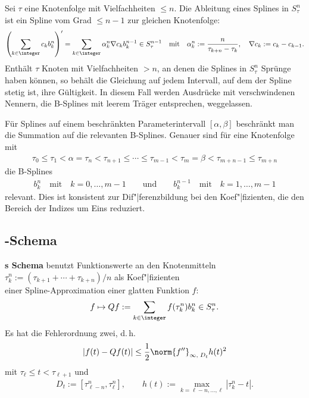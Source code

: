 Sei $\tau$ eine Knotenfolge mit Vielfachheiten $\le n$.
Die Ableitung eines Splines in $S_\tau^n$ ist ein Spline vom Grad $\le n - 1$
zur gleichen Knotenfolge:
\begin{align*}
    \left(\sum_{k \in \integer} c_k b_k^n\right)' =
    \sum_{k \in \integer} \alpha_k^n \nabla c_k b_k^{n-1} \in S_\tau^{n-1}
    \quad\text{mit}\quad
    \alpha_k^n := \frac{n}{\tau_{k+n} - \tau_k}, \quad
    \nabla c_k := c_k - c_{k-1}.
\end{align*}
Enthält $\tau$ Knoten mit Vielfachheiten $> n$, an denen die Splines in
$S_\tau^n$ Sprünge haben können, so behält die Gleichung auf jedem Intervall,
auf dem der Spline stetig ist, ihre Gültigkeit.
In diesem Fall werden Ausdrücke mit verschwindenen Nennern, die B-Splines mit
leerem Träger entsprechen, weggelassen.

\linie

Für Splines auf einem beschränkten Parameterintervall $[\alpha, \beta]$
beschränkt man die Summation auf die relevanten B-Splines.
Genauer sind für eine Knotenfolge mit
\begin{align*}
    \tau_0 \le \tau_1 < \alpha = \tau_n < \tau_{n+1} \le \dotsb \le
    \tau_{m-1} < \tau_m = \beta < \tau_{m+n-1} \le \tau_{m+n}
\end{align*}
die B-Splines
\begin{align*}
    b_k^n \quad\text{mit}\quad
    k = 0, \dotsc, m - 1 \qquad\text{und}\qquad
    b_k^{n-1} \quad\text{mit}\quad k = 1, \dotsc, m - 1
\end{align*}
relevant.
Dies ist konsistent zur Dif"|ferenzbildung bei den Koef"|fizienten, die den
Bereich der Indizes um Eins reduziert.

\subsection{%
    -Schema%
}

\textbf{s Schema} benutzt Funktionswerte an den
Knotenmitteln \\
$\tau_k^n := (\tau_{k+1} + \dotsb + \tau_{k+n})/n$ als Koef"|fizienten \\
einer Spline-Approximation einer glatten Funktion $f$:
\begin{align*}
    f \mapsto Qf := \sum_{k \in \integer} f(\tau_k^n) b_k^n \in S_\tau^n.
\end{align*}
Es hat die Fehlerordnung zwei, d.\,h.
\begin{align*}
    |f(t) - Qf(t)| \le \frac{1}{2} \norm{f''}_{\infty,\; D_t} h(t)^2
\end{align*}
mit $\tau_\ell \le t < \tau_{\ell+1}$ und
\begin{align*}
    D_t := [\tau_{\ell-n}^n, \tau_\ell^n], \qquad
    h(t) := \max_{k=\ell-n,\dotsc,\ell} |\tau_k^n - t|.
\end{align*}

